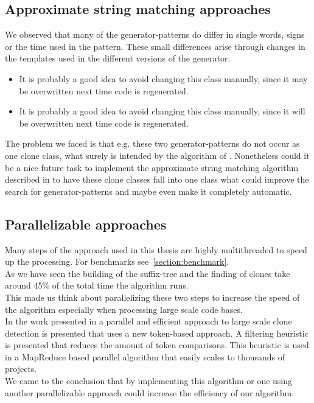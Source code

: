 \subsection{Approximate string matching approaches}
We observed that many of the generator-patterns do differ in single words, signs or the time used in the pattern. These small differences arise through changes in the templates used in the different versions of the generator. 
\begin{itemize}
	\item It is probably a good idea to avoid changing this class manually, since it \textcolor{TUMAccentOrange}{may} be overwritten next time code is regenerated.
	\item It is probably a good idea to avoid changing this class manually, since it \textcolor{TUMAccentOrange}{will} be overwritten next time code is regenerated.
\end{itemize}
The problem we faced is that e.g. these two generator-patterns do not occur as one clone class, what surely is intended by the algorithm of \cite{Ukkonen1995}. Nonetheless could it be a nice future task to implement the approximate string matching algorithm described in \cite{Ukkonen1993} to have these clone classes fall into one class what could improve the search for generator-patterns and maybe even make it completely automatic.

\subsection{Parallelizable approaches}
Many steps of the approach used in this thesis are highly multithreaded to speed up the processing. For benchmarks see~\ref{section:benchmark}.\\
As we have seen the building of the suffix-tree and the finding of clones take around 45\% of the total time the algorithm runs. \\
This made us think about parallelizing these two steps to increase the speed of the algorithm especially when processing large scale code bases.\\
In the work presented in \cite{Sajnani2013} a parallel and efficient approach to large scale clone detection is presented that uses a new token-based approach. A filtering heuristic is presented that reduces the amount of token comparisons. This heuristic is used in a MapReduce based parallel algorithm that easily scales to thousands of projects.\\
We came to the conclusion that by implementing this algorithm or one using another parallelizable approach could increase the efficiency of our algorithm. 


